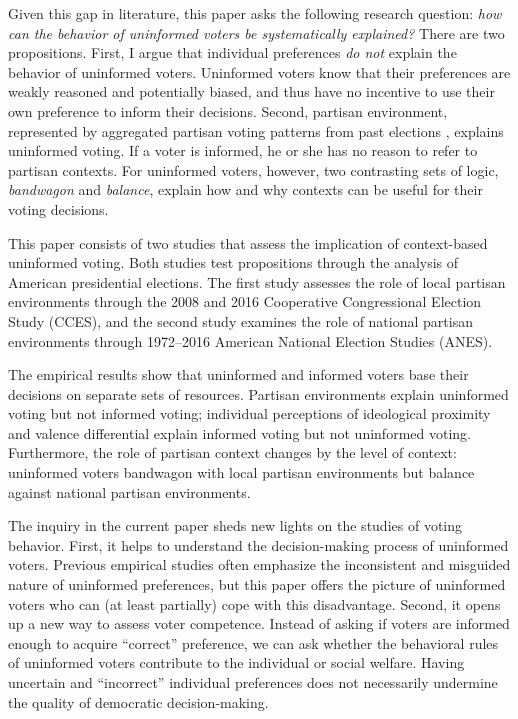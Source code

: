 \documentclass[letterpaper, 12pt]{article}
\begin{document}
    \par Given this gap in literature, this paper asks the following research question: \textit{how can the behavior of uninformed voters be systematically explained?} There are two propositions. First, I argue that individual preferences \textit{do not} explain the behavior of uninformed voters. Uninformed voters know that their preferences are weakly reasoned and potentially biased, and thus have no incentive to use their own preference to inform their decisions. Second, partisan environment, represented by aggregated partisan voting patterns from past elections \citep{Miller1956onpo, Putnam1966poat}, explains uninformed voting. If a voter is informed, he or she has no reason to refer to partisan contexts. For uninformed voters, however, two contrasting sets of logic, \textit{bandwagon} and \textit{balance}, explain how and why contexts can be useful for their voting decisions.
    
    \par This paper consists of two studies that assess the implication of context-based uninformed voting. Both studies test propositions through the analysis of American presidential elections. The first study assesses the role of local partisan environments through the 2008 and 2016 Cooperative Congressional Election Study (CCES), and the second study examines the role of national partisan environments through 1972--2016 American National Election Studies (ANES). 
    
    \par The empirical results show that uninformed and informed voters base their decisions on separate sets of resources. Partisan environments explain uninformed voting but not informed voting; individual perceptions of ideological proximity and valence differential explain informed voting but not uninformed voting. Furthermore, the role of partisan context changes by the level of context: uninformed voters bandwagon with local partisan environments but balance against national partisan environments. 
    
    \par The inquiry in the current paper sheds new lights on the studies of voting behavior. First, it helps to understand the decision-making process of uninformed voters. Previous empirical studies often emphasize the inconsistent and misguided nature of uninformed preferences, but this paper offers the picture of uninformed voters who can (at least partially) cope with this disadvantage. Second, it opens up a new way to assess voter competence. Instead of asking if voters are informed enough to acquire ``correct'' preference, we can ask whether the behavioral rules of uninformed voters contribute to the individual or social welfare. Having uncertain and ``incorrect'' individual preferences does not necessarily undermine the quality of democratic decision-making.
    
\end{document}
